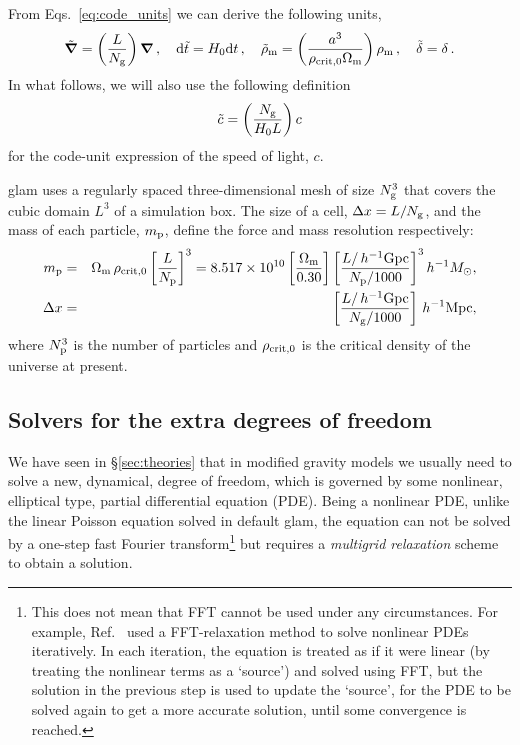 From Eqs.~\eqref{eq:code_units} we can derive the following units,
\begin{equation}\label{eq:code_units2}
\tilde{\boldsymbol{\nabla}} = \left(\frac{L}{N_{\rm g}}\right) \boldsymbol{\nabla}\,, \quad {\rm d} \tilde t = H_0 {\rm d} {t}\,, \quad \tilde{\rho}_{\rm m} = \left( \frac{a^3}{\rho_{\rm crit, 0}\Omega_{\rm m}}\right) \rho_{\rm m}\,, \quad \tilde{\delta} = \delta\,.
\end{equation}
In what follows, we will also use the following definition
\begin{equation}
    \tilde{c} = \left(\frac{N_{\rm g}}{H_0 L}\right) c
\end{equation}
for the code-unit expression of the speed of light, $c$.

{\sc glam} uses a regularly spaced three-dimensional mesh of size $N_{\rm g}^3$ that covers the cubic domain $L^3$ of a simulation box. The size of a cell, $\Delta x =L/N_{\rm g}$, and the mass of each particle, $m_{\rm p}$, define the force and mass resolution respectively:
\begin{eqnarray}
m_{\rm p} &=& \Omega_{\rm m} \, \rho_{\rm crit,0}\left[\frac{L}{N_{\rm p}}\right]^3 = 8.517\times 10^{10}\left[\frac{\Omega_{\rm m}}{0.30}\right]
\left[\frac{L/\,h^{-1}{\rm Gpc}}{N_{\rm p}/1000}\right]^3h^{-1}M_\odot, \label{eqn:mass_resolution_def}\\
\Delta x &=& \left[\frac{L/\,h^{-1}{\rm Gpc}}{N_{\rm g}/1000}\right]\,h^{-1}{\rm Mpc}, \label{eqn:force_resolution_def}
\end{eqnarray}
where $N_{\rm p}^3$ is the number of particles and $\rho_{\rm crit,0}$ is the critical density of the universe at present.

\subsection{Solvers for the extra degrees of freedom}
\label{subsect:extradof}

We have seen in \S\ref{sec:theories} that in modified gravity models we usually need to solve a new, dynamical, degree of freedom, which is governed by some nonlinear, elliptical type, partial differential equation (PDE). Being a nonlinear PDE, unlike the linear Poisson equation solved in default {\sc glam}, the equation can not be solved by a one-step fast Fourier transform\footnote{This does not mean that FFT cannot be used under any circumstances. For example, Ref.~\cite{Chan:2009ew} used a FFT-relaxation method to solve nonlinear PDEs iteratively. In each iteration, the equation is treated as if it were linear (by treating the nonlinear terms as a `source') and solved using FFT, but the solution in the previous step is used to update the `source', for the PDE to be solved again to get a more accurate solution, until some convergence is reached.} but requires a \textit{multigrid relaxation} scheme to obtain a solution.


